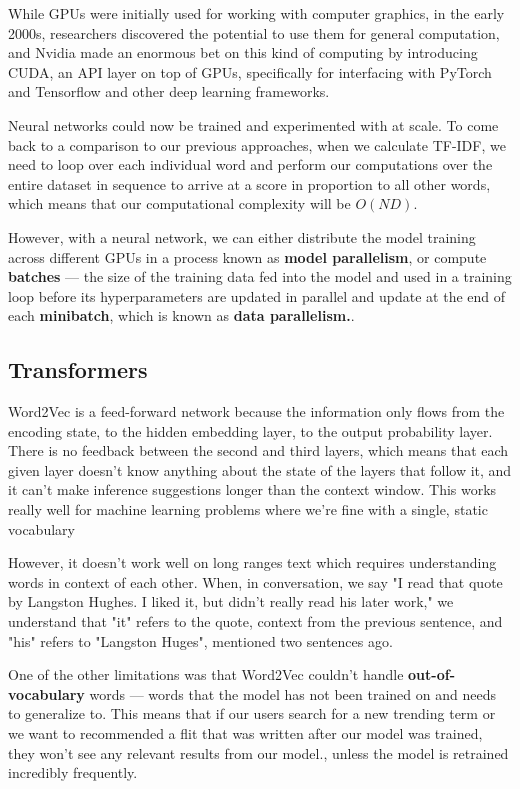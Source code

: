\documentclass[11pt, table]{diazessay} %
\begin{document}
\begin{sloppypar}
While GPUs were initially used for working with computer graphics, in the early 2000s\citep{oancea2014gpgpu}, researchers discovered the potential to use them for general computation, and Nvidia made an enormous bet on this kind of computing by introducing CUDA, an API layer on top of GPUs, specifically for interfacing with PyTorch and Tensorflow and other deep learning frameworks.

Neural networks could now be trained and experimented with at scale. To come back to a comparison to our previous approaches, when we calculate TF-IDF, we need to loop over each individual word and perform our computations over the entire dataset in sequence to arrive at a score in proportion to all other words, which means that our computational complexity will be $O(N D)$\citep{cong2016novel}.  

However, with a neural network, we can either distribute the model training across different GPUs in a process known as \textbf{model parallelism}, or compute \textbf{batches} --- the size of the training data fed into the model and used in a training loop before its hyperparameters are updated in parallel and update at the end of each \textbf{minibatch}, which is known as \textbf{data parallelism.}\citep{shallue2018measuring}.


\subsection{Transformers}

Word2Vec is a feed-forward network because the information only flows from the encoding state, to the hidden embedding layer, to the output probability layer. There is no feedback between the second and third layers, which means that each given layer doesn't know anything about the state of the layers that follow it, and it can't make inference suggestions longer than the context window. This works really well for  machine learning problems where we're fine with a single, static vocabulary

However, it doesn't work well on long ranges text which requires understanding words in context of each other. When, in conversation, we say "I read that quote by Langston Hughes. I liked it, but didn't really read his later work," we understand that "it" refers to the quote, context from the previous sentence, and "his" refers to "Langston Huges", mentioned two sentences ago. 

One of the other limitations was that Word2Vec couldn't handle \textbf{out-of-vocabulary} words --- words that the model has not been trained on and needs to generalize to. This means that if our users search for a new trending term or we want to recommended a flit that was written after our model was trained, they won't see any relevant results from our model.\citep{di2021considerations}, unless the model is retrained incredibly frequently. 


\end{sloppypar}
\end{document}

